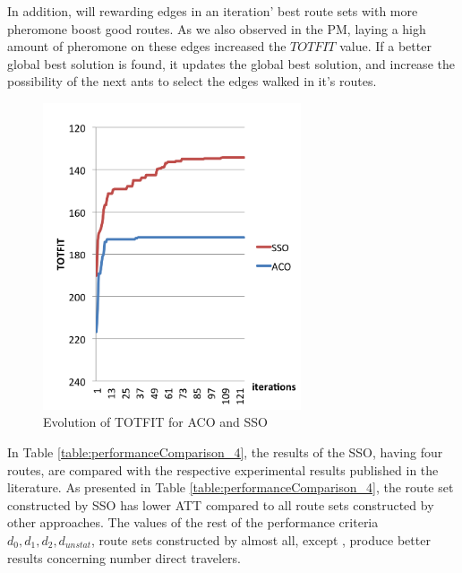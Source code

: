 In addition, will rewarding edges in an iteration' best route sets with more pheromone boost good routes. As we also observed in the PM, laying a high amount of pheromone on these edges increased the $TOTFIT$ value. If a better global best solution is found, it updates the global best solution, and increase the possibility of the next ants to select the edges walked in it's routes. 


 \begin{figure}[H]
    \begin{center}
    \includegraphics[width=3in]{assets/acovsssoNEW.png}
    \end{center}
    \caption{Evolution of TOTFIT for ACO and SSO }
    \label{fig:acovssso} 
\end{figure}

In Table \vref{table:performanceComparison_4}, the results of the SSO, having four routes, are compared with the respective experimental results published in the literature. As presented in Table \vref{table:performanceComparison_4}, the route set constructed by SSO has lower ATT compared to all route sets constructed by other approaches. The values of the rest of the performance criteria $d_0, d_1, d_2, d_{unstat}$, route sets constructed by almost all, except \citep{mandl79, kidwai98, chakroborty02}, produce better results concerning number direct travelers. 

